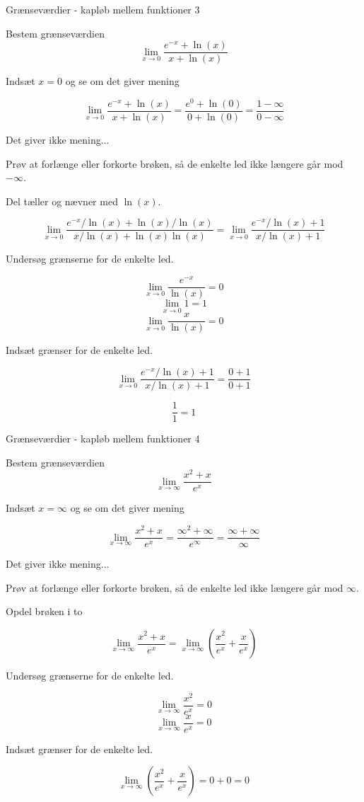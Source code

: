 \documentclass{article}
\begin{document}
\begin{exercise}{Grænseværdier - kapløb mellem funktioner 3}
	
	Bestem grænseværdien 
	\[
	\lim_{x \to 0} \frac{e^{-x}+ \ln(x)}{x+\ln(x)}
	\]
	
	
	\hint
	Indsæt $x=0$ og se om det giver mening
	
	\hint
	\[
	\lim_{x \to 0} \frac{e^{-x}+ \ln(x)}{x+\ln(x)} = \frac{e^{0}+ \ln(0)}{0+\ln(0)} = \frac{1 - \infty}{0 -\infty}
	\]
	
	\hint
	Det giver ikke mening...
	
	\hint
	Prøv at forlænge eller forkorte brøken, så de enkelte led ikke længere går mod $-\infty$. 
	
	\hint
	Del tæller og nævner med $\ln(x)$. 
	
	\hint
	\[
	\lim_{x \to 0} \frac{e^{-x}/\ln(x)+ \ln(x)/\ln(x)}{x/\ln(x)+\ln(x)\ln(x)} = \lim_{x \to 0} \frac{e^{-x}/\ln(x)+ 1}{x/\ln(x)+1}
	\]
	
	\hint
	Undersøg grænserne for de enkelte led.
	
	\hint
	\[
	\lim_{x \to 0} \frac{e^{-x}}{\ln(x)} = 0
	\]
	\[
	\lim_{x \to 0} 1 = 1
	\]
	\[
	\lim_{x \to 0} \frac{x}{\ln(x)} = 0  
	\]
	
	\hint 
	Indsæt grænser for de enkelte led.
	
	\hint
	\[
	\lim_{x \to 0} \frac{e^{-x}/\ln(x)+ 1}{x/\ln(x)+1} =  \frac{0+ 1}{0+1}
	\]
	
	\hint
	\[
	\frac{1}{1} = 1
	\]
	
\end{exercise}
\newpage

\begin{exercise}{Grænseværdier - kapløb mellem funktioner 4}
	
	Bestem grænseværdien 
	\[
	\lim_{x \to \infty} \frac{x^2+x}{e^x}
	\]
	
	
	\hint
	Indsæt $x=\infty$ og se om det giver mening
	
	\hint
	\[
	\lim_{x \to \infty} \frac{x^2+x}{e^x} = \frac{\infty^2+\infty}{e^\infty} = \frac{\infty + \infty}{\infty} 
	\]
	
	\hint
	Det giver ikke mening...
	
	\hint
	Prøv at forlænge eller forkorte brøken, så de enkelte led ikke længere går mod $\infty$. 
	
	\hint
	Opdel brøken i to
	
	\hint
	\[
	\lim_{x \to \infty} \frac{x^2+x}{e^x} = \lim_{x \to \infty} \left( \frac{x^2}{e^x} + \frac{x}{e^x} \right)
	\]
	
	\hint
	Undersøg grænserne for de enkelte led.
	
	\hint
	\[
	\lim_{x \to \infty} \frac{x^2}{e^x} = 0
	\]
	\[
	\lim_{x \to \infty} \frac{x}{e^x} = 0
	\]
	
	\hint 
	Indsæt grænser for de enkelte led.
	
	\hint
	\[
	\lim_{x \to \infty} \left( \frac{x^2}{e^x} + \frac{x}{e^x} \right) = 0+0 = 0
	\]
	
	
\end{exercise}
\newpage
\end{document}
